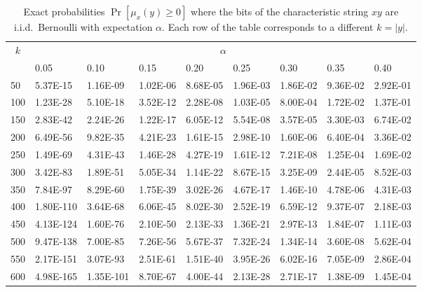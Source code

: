 \begin{table}[h]
	\centering
	\caption[Exact settlement error probabilities for Boolean characteristic strings]{
		Exact probabilities $\Pr[\mu_x(y) \geq 0]$ where 
		the bits of the characteristic string $xy$ are i.i.d.\ Bernoulli with expectation $\alpha$. 
		Each row of the table corresponds to a different $k = |y|$.
	} 
	\label{table:exact-probs}


	\begin{tabular}{|l||l|l|l|l|l|l|l|l|}
	\hline
	\multicolumn{1}{|c||}{\multirow{2}{*}{$k$}} & \multicolumn{8}{c|}{$\alpha$}                                             \\ \cline{2-9} 
	\multicolumn{1}{|c||}{}                   & 0.05     & 0.10      & 0.15     & 0.20      & 0.25     & 0.30      & 0.35     & 0.40      \\ 
	\hhline{|=#=|=|=|=|=|=|=|=|}
	50   & 5.37E-15  & 1.16E-09  & 1.02E-06  & 8.68E-05 & 1.96E-03 & 1.86E-02 & 9.36E-02 & 2.92E-01 \\ \hline
	100  & 1.23E-28  & 5.10E-18  & 3.52E-12  & 2.28E-08 & 1.03E-05 & 8.00E-04 & 1.72E-02 & 1.37E-01 \\ \hline
	150  & 2.83E-42  & 2.24E-26  & 1.22E-17  & 6.05E-12 & 5.54E-08 & 3.57E-05 & 3.30E-03 & 6.74E-02 \\ \hline
	200  & 6.49E-56  & 9.82E-35  & 4.21E-23  & 1.61E-15 & 2.98E-10 & 1.60E-06 & 6.40E-04 & 3.36E-02 \\ \hline
	250  & 1.49E-69  & 4.31E-43  & 1.46E-28  & 4.27E-19 & 1.61E-12 & 7.21E-08 & 1.25E-04 & 1.69E-02 \\ \hline
	300  & 3.42E-83  & 1.89E-51  & 5.05E-34  & 1.14E-22 & 8.67E-15 & 3.25E-09 & 2.44E-05 & 8.52E-03 \\ \hline
	350  & 7.84E-97  & 8.29E-60  & 1.75E-39  & 3.02E-26 & 4.67E-17 & 1.46E-10 & 4.78E-06 & 4.31E-03 \\ \hline
	400  & 1.80E-110 & 3.64E-68  & 6.06E-45  & 8.02E-30 & 2.52E-19 & 6.59E-12 & 9.37E-07 & 2.18E-03 \\ \hline
	450  & 4.13E-124 & 1.60E-76  & 2.10E-50  & 2.13E-33 & 1.36E-21 & 2.97E-13 & 1.84E-07 & 1.11E-03 \\ \hline
	500  & 9.47E-138 & 7.00E-85  & 7.26E-56  & 5.67E-37 & 7.32E-24 & 1.34E-14 & 3.60E-08 & 5.62E-04 \\ \hline
	550  & 2.17E-151 & 3.07E-93  & 2.51E-61  & 1.51E-40 & 3.95E-26 & 6.02E-16 & 7.05E-09 & 2.86E-04 \\ \hline
	600  & 4.98E-165 & 1.35E-101 & 8.70E-67  & 4.00E-44 & 2.13E-28 & 2.71E-17 & 1.38E-09 & 1.45E-04 \\ \hline

\end{tabular}
\end{table}
